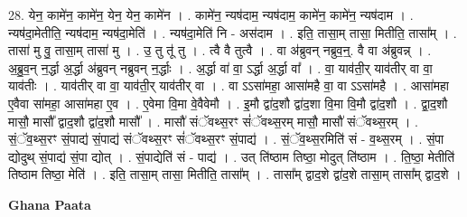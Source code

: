 \documentclass[17pt]{extarticle}
\begin{document}
28. येन॒ कामे॑न॒ कामे॑न॒ येन॒ येन॒ कामे॑न । . कामे॑न॒ न्यष॑दाम॒ न्यष॑दाम॒ कामे॑न॒ कामे॑न॒ न्यष॑दाम । . न्यष॑दा॒मेतीति॒ न्यष॑दाम॒ न्यष॑दा॒मेति॑ । . न्यष॑दा॒मेति॑ नि - अस॑दाम । . इति॒ तासा॒म् तासा॒ मितीति॒ तासा᳚म् । . तासा॑ मु वु॒ तासा॒म् तासा॑ मु । . उ॒ तु तू॑ तु । . त्वै वै तुत्वै । . वा अ॑ब्रुवन् नब्रुव॒न्॒. वै वा अ॑ब्रुवन्न् । . अ॒ब्रु॒व॒न् न॒र्द्धा अ॒र्द्धा अ॑ब्रुवन् नब्रुवन् न॒र्द्धाः । . अ॒र्द्धा वा॑ वा॒ ऽर्द्धा अ॒र्द्धा वा᳚ । . वा॒ याव॑ती॒र् याव॑तीर् वा वा॒ याव॑तीः । . याव॑तीर् वा वा॒ याव॑ती॒र् याव॑तीर् वा । . वा ऽऽसा॑महा॒ आसा॑महै वा॒ वा ऽऽसा॑महै । . आसा॑महा ए॒वैवा सा॑महा॒ आसा॑महा ए॒व । . ए॒वेमा वि॒मा वे॒वैवेमौ । . इ॒मौ द्वा॑द॒शौ द्वा॑द॒शा वि॒मा वि॒मौ द्वा॑द॒शौ । . द्वा॒द॒शौ मासौ॒ मासौ᳚ द्वाद॒शौ द्वा॑द॒शौ मासौ᳚ । . मासौ॑ संॅवथ्स॒रꣳ सं॑ॅवथ्स॒रम् मासौ॒ मासौ॑ संॅवथ्स॒रम् । . सं॒ॅव॒थ्स॒रꣳ सं॒पाद्य॑ सं॒पाद्य॑ संॅवथ्स॒रꣳ सं॑ॅवथ्स॒रꣳ सं॒पाद्य॑ । . सं॒ॅव॒थ्स॒रमिति॑ सं - व॒थ्स॒रम् । . सं॒पा द्योदुथ् सं॒पाद्य॑ सं॒पा द्योत् । . सं॒पाद्येति॑ सं - पाद्य॑ । . उत् ति॑ष्ठाम तिष्ठा॒ मोदुत् ति॑ष्ठाम । . ति॒ष्ठा॒ मेतीति॑ तिष्ठाम तिष्ठा॒ मेति॑ । . इति॒ तासा॒म् तासा॒ मितीति॒ तासा᳚म् । . तासा᳚म् द्वाद॒शे द्वा॑द॒शे तासा॒म् तासा᳚म् द्वाद॒शे । \newline

\textbf{Ghana Paata } \newline
\end{document}
